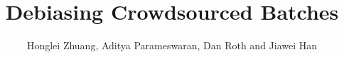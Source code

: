 \documentclass{sig-alternate}
\newcommand{\hide}[1]{} %
\begin{document}
\title{
Debiasing Crowdsourced Batches %
}



\author{
\alignauthor Honglei Zhuang, Aditya Parameswaran, Dan Roth and Jiawei Han \\
  \\
  \\
}



%



\maketitle




\hide{
\category{H.2.8}{Database Applications}{Data mining}
\category{J.4}{Social and Behavioral Sciences}{Psychology}

\keywords{Crowdsourcing; annotation bias; worker model}
}


\sloppy











\balance
\vspace{-0.1in}
\small




%
\end{document}
